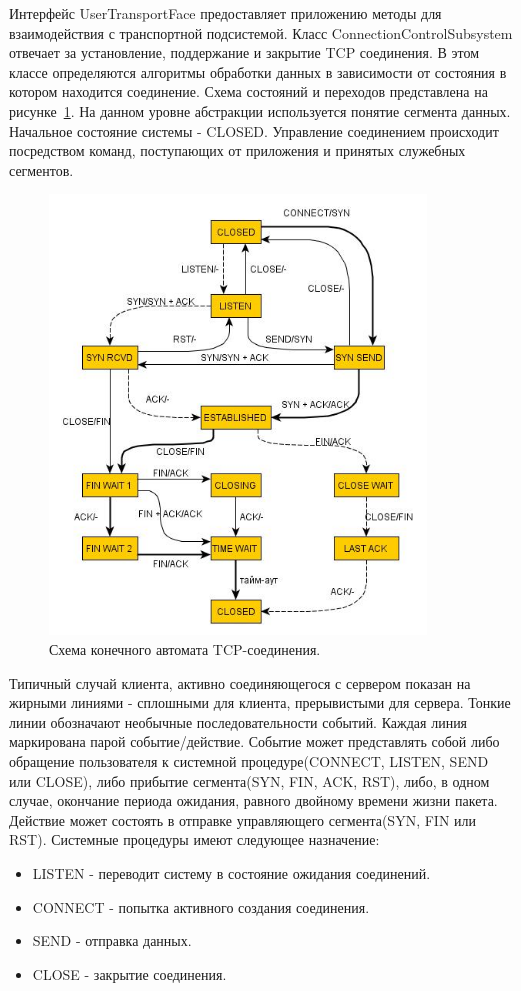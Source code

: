 \documentclass[12pt]{report}
\begin{document}
    Интерфейс UserTransportFace предоставляет приложению методы для взаимодействия с транспортной подсистемой. Класс ConnectionControlSubsystem отвечает за установление, поддержание и закрытие TCP соединения. В этом классе определяются алгоритмы обработки данных в зависимости от состояния в котором находится соединение. Схема состояний и переходов представлена на рисунке~\ref{Pic7}. На данном уровне абстракции используется понятие сегмента данных. Начальное состояние системы - CLOSED. Управление соединением происходит посредством команд, поступающих от приложения и принятых служебных сегментов. 
    
    

    \begin{figure}[h!]\center
        \includegraphics[width = 100mm]{Ch3Pic7}
        \caption{Схема конечного автомата TCP-соединения. } \label{Pic7}
    \end{figure}    
    

    Типичный случай клиента, активно соединяющегося с сервером показан на жирными линиями - сплошными для клиента, прерывистыми для сервера. Тонкие линии обозначают необычные последовательности событий. Каждая линия маркирована парой событие/действие. Событие может представлять собой либо обращение пользователя к системной процедуре(CONNECT, LISTEN, SEND или CLOSE), либо прибытие сегмента(SYN, FIN, ACK, RST), либо, в одном случае, окончание периода ожидания, равного двойному времени жизни пакета. Действие может состоять в отправке управляющего сегмента(SYN, FIN или RST). Системные процедуры имеют следующее назначение:
    \begin{itemize}
        \item LISTEN - переводит систему в состояние ожидания соединений.
        \item CONNECT - попытка активного создания соединения.
        \item SEND - отправка данных.
        \item CLOSE - закрытие соединения.
    \end{itemize}
    
\end{document}
